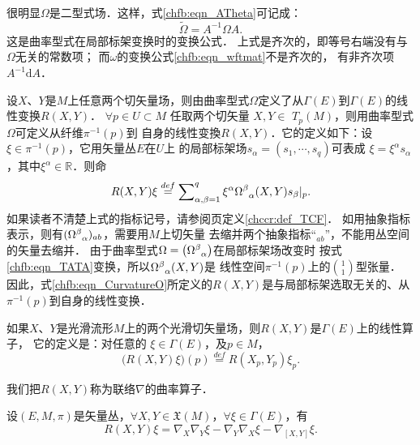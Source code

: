 很明显$\Omega$是二型式场．这样，式\eqref{chfb:eqn_ATheta}可记成：
\begin{equation}\label{chfb:eqn_TATA}
    \widetilde{\Omega} =A^{-1} \Omega A .
\end{equation}
这是曲率型式在局部标架变换时的变换公式．
上式是齐次的，即等号右端没有与$\Omega$无关的常数项；
而$\omega$的变换公式\eqref{chfb:eqn_wftmat}不是齐次的，
有非齐次项$A^{-1} \mathrm{d}A$．


设$X$、$Y$是$M$上任意两个切矢量场，则由曲率型式$\Omega$定义了从$\Gamma(E)$到$\Gamma(E)$的线性变换$R(X, Y)$．
$\forall p \in U\subset M$ 任取两个切矢量 $X, Y \in$ $T_p(M)$，则用曲率型式$\Omega$可定义从纤维$\pi^{-1}(p)$到
自身的线性变換$R(X, Y)$．它的定义如下：设 $\xi \in \pi^{-1}(p)$，它用矢量丛$E$在$U$上
的局部标架场$s_\alpha=\left(s_1, \cdots, s_q\right)$可表成
$\xi = \xi^\alpha s_{\alpha}$，其中$\xi^\alpha \in \mathbb{R}$．则命
\begin{equation}\label{chfb:eqn_CurvatureO}
    R(X, Y) \xi \overset{def}{=}\sum\nolimits_{\alpha, \beta=1}^q \xi^\alpha 
    \Omega_{\hphantom{\alpha}\alpha}^\beta(X, Y) s_{\beta}|_p .
\end{equation}
如果读者不清楚上式的指标记号，请参阅\pageref{chccr:def_TCF}页定义\ref{chccr:def_TCF}．
如用抽象指标表示，则有$(\Omega_{\hphantom{\alpha}\alpha}^\beta)_{ab}$，需要用$M$上切矢量
去缩并两个抽象指标“${}_{ab}$”，不能用丛空间的矢量去缩并．
由于曲率型式$\Omega=\left(\Omega_{\hphantom{\alpha}\alpha}^\beta\right)$在局部标架场改变时
按式\eqref{chfb:eqn_TATA}变换，所以$\Omega_{\hphantom{\alpha}\alpha}^\beta(X, Y)$是
线性空间$\pi^{-1}(p)$上的$\binom{1}{1}$型张量．
因此，式\eqref{chfb:eqn_CurvatureO}所定义的$R(X, Y)$是与局部标架选取无关的、从$\pi^{-1}(p)$到自身的线性变换．

如果$X$、$Y$是光滑流形$M$上的两个光滑切矢量场，则$R(X, Y)$是$\Gamma(E)$上的线性算子，
它的定义是：对任意的 $\xi \in \Gamma(E)$，及$p \in  M$，
\begin{equation}\label{chfb:eqn_RppR}
    \bigl(R(X, Y) \xi \bigr)(p)\overset{def}{=}R\left(X_p, Y_p\right) \xi_p .
\end{equation}

我们把$R(X, Y)$称为联络$\nabla$的{\heiti 曲率算子}．

\begin{theorem}\label{chfb:thm_Riemann-Curvature}
    设$(E,M,\pi)$是矢量丛，$\forall X, Y\in \mathfrak{X}(M)$，$\forall \xi \in \Gamma(E)$，有
    \begin{equation}\label{chfb:eqn_Riemann-Curvature}
       R(X, Y)\xi=\nabla_X \nabla_Y\xi- \nabla_Y \nabla_X\xi-\nabla_{[X, Y]}\xi .
    \end{equation}
\end{theorem}

